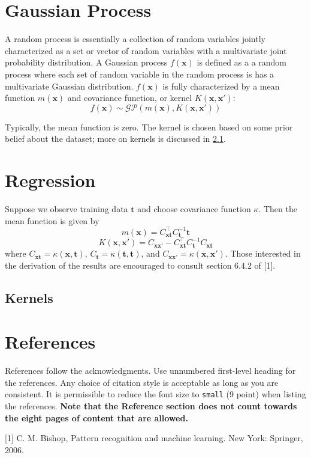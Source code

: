 \documentclass{article}
\begin{document}
\section{Gaussian Process}
A random process is essentially a collection of random variables jointly characterized  as a set or vector of random variables with a multivariate joint probability distribution. A Gaussian process $f(\boldsymbol{x})$ is defined as a a random process where each set of random variable in the random process is has a multivariate Gaussian distribution. $f(\boldsymbol{x})$ is fully characterized by a mean function  $m(\boldsymbol{x})$ and covariance function, or kernel $K(\boldsymbol{x},\boldsymbol{x'})$:
\[f(\boldsymbol{x})\sim\mathcal{GP}(m(\boldsymbol{x}),K(\boldsymbol{x},\boldsymbol{x'}))\]

Typically, the mean function is zero. The kernel is chosen based on some prior belief about the dataset; more on kernels is discussed in \ref{subsection:kernels}.

\section{Regression}
Suppose we observe training data $\boldsymbol{t}$ and choose covariance function $\kappa$. Then the mean function is given by
\[m(\boldsymbol{x})=C_{\boldsymbol{x}\boldsymbol{t}}^\top C_{\boldsymbol{t}}^{-1}\boldsymbol{t}\]
\[K(\boldsymbol{x},\boldsymbol{x'})=C_{\boldsymbol{x}\boldsymbol{x'}}-C_{\boldsymbol{x}\boldsymbol{t}}^\top C_{\boldsymbol{t}}^{-1}C_{\boldsymbol{x}\boldsymbol{t}}\]
where $C_{\boldsymbol{x}\boldsymbol{t}} = \kappa(\boldsymbol{x},\boldsymbol{t})$, $C_{\boldsymbol{t}} = \kappa(\boldsymbol{t},\boldsymbol{t})$, and $C_{\boldsymbol{x}\boldsymbol{x'}} = \kappa(\boldsymbol{x},\boldsymbol{x'})$.
Those interested in the derivation of the results are encouraged to consult section 6.4.2 of [1].
\subsection{Kernels}
\label{subsection:kernels}

\section*{References}

References follow the acknowledgments. Use unnumbered first-level heading for
the references. Any choice of citation style is acceptable as long as you are
consistent. It is permissible to reduce the font size to \verb+small+ (9 point)
when listing the references.
{\bf Note that the Reference section does not count towards the eight pages of content that are allowed.}
\medskip

\small

[1] C. M. Bishop, Pattern recognition and machine learning. New York: Springer, 2006.
\end{document}
